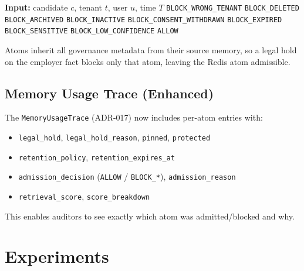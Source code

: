 \documentclass[11pt]{article}
\begin{document}
\begin{algorithm}
\caption{Admission Decision per Candidate}
\begin{algorithmic}
\STATE \textbf{Input:} candidate $c$, tenant $t$, user $u$, time $T$
 \RETURN \texttt{BLOCK\_WRONG\_TENANT} \ENDIF
{} \RETURN \texttt{BLOCK\_DELETED} \ENDIF
{} \RETURN \texttt{BLOCK\_ARCHIVED} \ENDIF
{} \RETURN \texttt{BLOCK\_INACTIVE} \ENDIF
{} \RETURN \texttt{BLOCK\_CONSENT\_WITHDRAWN} \ENDIF
{} \RETURN \texttt{BLOCK\_EXPIRED} \ENDIF
{} \RETURN \texttt{BLOCK\_SENSITIVE} \ENDIF
{} \RETURN \texttt{BLOCK\_LOW\_CONFIDENCE} \ENDIF
\RETURN \texttt{ALLOW}
\end{algorithmic}
\end{algorithm}

Atoms inherit all governance metadata from their source memory, so a legal hold on the employer fact blocks only that atom, leaving the Redis atom admissible.

\subsection{Memory Usage Trace (Enhanced)}
\label{sec:trace}

The \texttt{MemoryUsageTrace} (ADR-017) now includes per-atom entries with:
\begin{itemize}
  \item \texttt{legal\_hold}, \texttt{legal\_hold\_reason}, \texttt{pinned}, \texttt{protected}
  \item \texttt{retention\_policy}, \texttt{retention\_expires\_at}
  \item \texttt{admission\_decision} (\texttt{ALLOW} / \texttt{BLOCK\_*}), \texttt{admission\_reason}
  \item \texttt{retrieval\_score}, \texttt{score\_breakdown}
\end{itemize}

This enables auditors to see exactly which atom was admitted/blocked and why.

\section{Experiments}
\label{sec:experiments}
\end{document}
